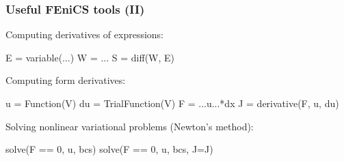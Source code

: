 \begin{frame}[fragile]
  \frametitle{Useful FEniCS tools (II)}

  \linespread{1.0}

  Computing derivatives of expressions:
  \vspace{-0.5cm}
\begin{python}
E = variable(...)
W = ...
S = diff(W, E)
\end{python}

  Computing form derivatives:
  \vspace{-0.5cm}
\begin{python}
u  = Function(V)
du = TrialFunction(V)
F  = ...u...*dx
J  = derivative(F, u, du)
\end{python}

  Solving nonlinear variational problems (Newton's method):
  \vspace{-0.5cm}
\begin{python}
solve(F == 0, u, bcs)
solve(F == 0, u, bcs, J=J)
\end{python}

  \linespread{1.5}

\end{frame}
